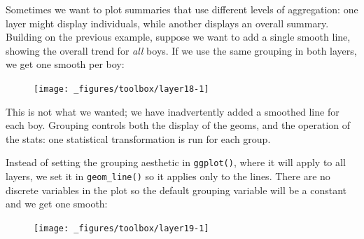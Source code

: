 Sometimes we want to plot summaries that use different levels of
aggregation: one layer might display individuals, while another displays
an overall summary. Building on the previous example, suppose we want to
add a single smooth line, showing the overall trend for \emph{all} boys.
If we use the same grouping in both layers, we get one smooth per boy:

\begin{Shaded}
\begin{Highlighting}[]
 \StringTok{ }
\StringTok{  }\NormalTok{() +}\StringTok{ }
\StringTok{  }\NormalTok{(} \NormalTok{, } \NormalTok{)}
\end{Highlighting}
\end{Shaded}

\begin{figure}[H]
  \centering
  \texttt{[image: \_figures/toolbox/layer18-1]}
\end{figure}

This is not what we wanted; we have inadvertently added a smoothed line
for each boy. Grouping controls both the display of the geoms, and the
operation of the stats: one statistical transformation is run for each
group.

Instead of setting the grouping aesthetic in \texttt{ggplot()}, where it
will apply to all layers, we set it in \texttt{geom\_line()} so it
applies only to the lines. There are no discrete variables in the plot
so the default grouping variable will be a constant and we get one
smooth:

\begin{Shaded}
\begin{Highlighting}[]
\StringTok{ }
\StringTok{  }\NormalTok{(}\NormalTok{(} \StringTok{ }
\StringTok{  }\NormalTok{(} \NormalTok{, } \NormalTok{, } \NormalTok{)}
\end{Highlighting}
\end{Shaded}

\begin{figure}[H]
  \centering
  \texttt{[image: \_figures/toolbox/layer19-1]}
\end{figure}

